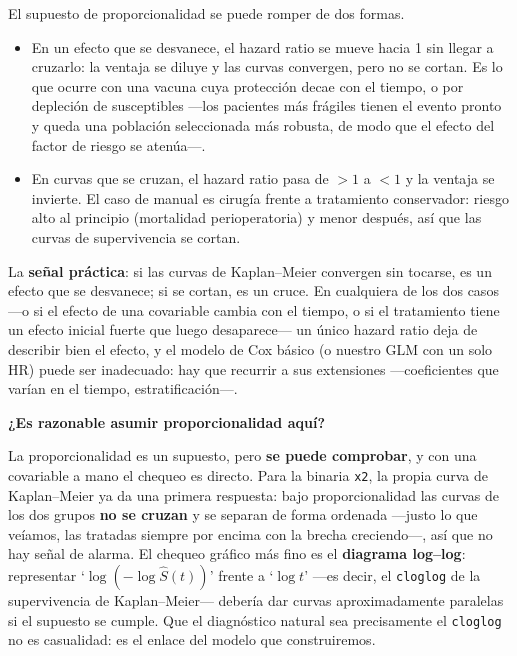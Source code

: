 \documentclass[
  letterpaper,
  DIV=11,
  numbers=noendperiod]{scrartcl}
\providecommand{\tightlist}{%
  \setlength{\itemsep}{0pt}\setlength{\parskip}{0pt}}\usepackage{longtable,booktabs,array}
\begin{document}
\begin{tcolorbox}[enhanced jigsaw, breakable, colframe=quarto-callout-note-color-frame, left=2mm, arc=.35mm, colbacktitle=quarto-callout-note-color!10!white, toprule=.15mm, colback=white, coltitle=black, rightrule=.15mm, opacitybacktitle=0.6, title=\textcolor{quarto-callout-note-color}{\faInfo}\hspace{0.5em}{Cuándo falla la proporcionalidad}, titlerule=0mm, toptitle=1mm, bottomtitle=1mm, leftrule=.75mm, bottomrule=.15mm, opacityback=0]

El supuesto de proporcionalidad se puede romper de dos formas.

\begin{itemize}
\tightlist
\item
  En un efecto que se desvanece, el hazard ratio se mueve hacia 1 sin
  llegar a cruzarlo: la ventaja se diluye y las curvas convergen, pero
  no se cortan. Es lo que ocurre con una vacuna cuya protección decae
  con el tiempo, o por depleción de susceptibles ---los pacientes más
  frágiles tienen el evento pronto y queda una población seleccionada
  más robusta, de modo que el efecto del factor de riesgo se atenúa---.
\item
  En curvas que se cruzan, el hazard ratio pasa de \(>1\) a \(<1\) y la
  ventaja se invierte. El caso de manual es cirugía frente a tratamiento
  conservador: riesgo alto al principio (mortalidad perioperatoria) y
  menor después, así que las curvas de supervivencia se cortan.
\end{itemize}

La \textbf{señal práctica}: si las curvas de Kaplan--Meier convergen sin
tocarse, es un efecto que se desvanece; si se cortan, es un cruce. En
cualquiera de los dos casos ---o si el efecto de una covariable cambia
con el tiempo, o si el tratamiento tiene un efecto inicial fuerte que
luego desaparece--- un único hazard ratio deja de describir bien el
efecto, y el modelo de Cox básico (o nuestro GLM con un solo HR) puede
ser inadecuado: hay que recurrir a sus extensiones ---coeficientes que
varían en el tiempo, estratificación---.

\end{tcolorbox}

\textbf{¿Es razonable asumir proporcionalidad aquí?}

La proporcionalidad es un supuesto, pero \textbf{se puede comprobar}, y
con una covariable a mano el chequeo es directo. Para la binaria
\texttt{x2}, la propia curva de Kaplan--Meier ya da una primera
respuesta: bajo proporcionalidad las curvas de los dos grupos \textbf{no
se cruzan} y se separan de forma ordenada ---justo lo que veíamos, las
tratadas siempre por encima con la brecha creciendo---, así que no hay
señal de alarma. El chequeo gráfico más fino es el \textbf{diagrama
log--log}: representar `\(\log(-\log\widehat S(t))\)' frente a
`\(\log t\)' ---es decir, el \texttt{cloglog} de la supervivencia de
Kaplan--Meier--- debería dar curvas aproximadamente paralelas si el
supuesto se cumple. Que el diagnóstico natural sea precisamente el
\texttt{cloglog} no es casualidad: es el enlace del modelo que
construiremos.
\end{document}
